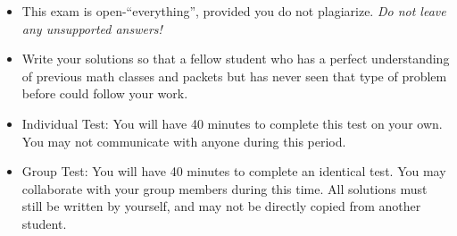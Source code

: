 \documentclass[12pt]{exam}
\newcommand{\<}{\langle}
\renewcommand{\>}{\rangle}
\begin{document}
\begin{center}
\end{center}
\vspace{0.1in}

\vspace{12pt}

\begin{itemize}
  \item This exam is open-``everything'', provided you do not plagiarize.
        \textit{Do not leave any unsupported answers!}
  \item Write your solutions so that a fellow student who has a perfect
        understanding of previous math classes and packets but
        has never seen that type of problem before could follow your work.
  \item Individual Test: You will have 40 minutes to complete this test
        on your own. You may not communicate with anyone during this period.
  \item Group Test: You will have 40 minutes to complete an identical test.
        You may collaborate with your group members during this time. All
        solutions must still be written by yourself, and may not be directly
        copied from another student.
\end{itemize}

\newpage
\end{document}
